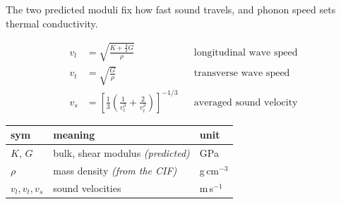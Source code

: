 \begin{frame}

{\sffamily\scriptsize
The two predicted moduli fix how fast sound travels, and phonon speed sets
thermal conductivity.}

\vspace{3pt}
\begin{align}
v_l &= \sqrt{\frac{K + \tfrac{4}{3}G}{\rho}} &&\text{longitudinal wave speed} \\[2pt]
v_t &= \sqrt{\frac{G}{\rho}} &&\text{transverse wave speed} \\[2pt]
v_s &= \left[\frac{1}{3}\left(\frac{1}{v_l^{3}} + \frac{2}{v_t^{3}}\right)\right]^{-1/3}
   &&\text{averaged sound velocity}
\end{align}

\vspace{2pt}
\begin{center}
{\sffamily\scriptsize
\begin{tabular}{@{}lll@{}}
\toprule
sym & meaning & unit \\
\midrule
$K$, $G$ & bulk, shear modulus \emph{(predicted)} & GPa \\
$\rho$ & mass density \emph{(from the CIF)} & g\,cm$^{-3}$ \\
$v_l, v_t, v_s$ & sound velocities & m\,s$^{-1}$ \\
\bottomrule
\end{tabular}}
\end{center}


\end{frame}

